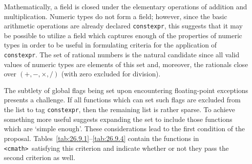 \documentclass[prd,twocolumn,amsmath,amssymb,nofootinbib,eqsecnum]{revtex4-1}
\newcommand{\constexpr}{\code{constexpr}\xspace}
\newcommand{\code}[1]{{\tt #1}}
\newcommand{\header}[1]{{\tt <#1>}}
\newcommand{\cmath}{\header{cmath}}
\begin{document}
Mathematically, a field is closed under the elementary operations of addition
and multiplication.
Numeric types do not form a field; however, since the basic arithmetic
operations are already declared \constexpr, this suggests that it may be
possible to utilize a field which captures enough of the properties of numeric
types in order to be useful in formulating criteria for the application of
\constexpr. The set of rational numbers is the natural candidate since all valid
values of numeric types are elements of this set and, moreover, the rationals close over
$(+,-,\times,/)$ (with zero excluded for division).

The subtlety of global flags being set upon encountering floating-point
exceptions presents a challenge. If all functions which can set such flags are
excluded from the list to tag \constexpr, then the remaining list is rather
sparse. To achieve something more useful suggests expanding the set to include
those functions which are `simple enough'. These considerations lead to the
first condition of the proposal.
Tables~\ref{tab:26.9.1}--\ref{tab:26.9.4} contain the functions in \cmath\
satisfying this criterion and indicate whether or not they pass the second criterion as well. 
\end{document}
